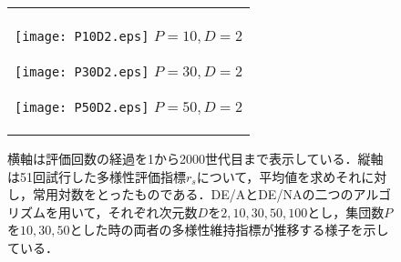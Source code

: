 \documentclass[a4paper,11pt,oneside,openany]{jsbook}
\begin{document}
\begin{figure}[htbp]
  \begin{center}
  \caption{横軸は評価回数の経過を1から2000世代目まで表示している．縦軸は51回試行した多様性評価指標$r_s$について，平均値を求めそれに対し，常用対数をとったものである．DE/AとDE/NAの二つのアルゴリズムを用いて，それぞれ次元数$D$を$2,10,30,50,100$とし，集団数$P$を$10,30,50$とした時の両者の多様性維持指標が推移する様子を示している．}
    \begin{tabular}{c}
      \begin{minipage}{0.33\hsize}
        \begin{center}
          \texttt{[image: P10D2.eps]}
          \hspace{1.2cm}$P=10, D=2
 $       \end{center}
      \end{minipage}

      \begin{minipage}{0.33\hsize}
        \begin{center}
          \texttt{[image: P30D2.eps]}
          \hspace{1.2cm}$P=30, D=2
 $       \end{center}
      \end{minipage}

      \begin{minipage}{0.33\hsize}
        \begin{center}
          \texttt{[image: P50D2.eps]}
          \hspace{1.2cm}$P=50, D=2
 $       \end{center}
      \end{minipage}
    \end{tabular}
  \end{center}
\end{figure}
\end{document}
